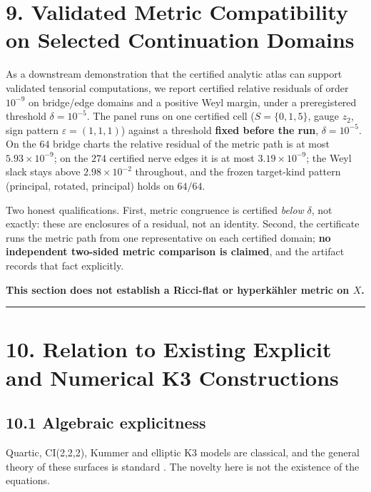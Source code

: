 \section{9. Validated Metric Compatibility on Selected Continuation Domains}\label{validated-metric-compatibility-on-selected-continuation-domains}

As a downstream demonstration that the certified analytic atlas can support validated tensorial computations, we report certified relative residuals of order \(10^{-9}\) on bridge/edge domains and a positive Weyl margin, under a preregistered threshold \(\delta = 10^{-5}\). The panel runs on one certified cell (\(S = \{0,1,5\}\), gauge \(z_2\), sign pattern \(\varepsilon = (1,1,1)\)) against a threshold \textbf{fixed before the run}, \(\delta = 10^{-5}\). On the \(64\) bridge charts the relative residual of the metric path is at most \(5.93 \times 10^{-9}\); on the \(274\) certified nerve edges it is at most \(3.19 \times 10^{-9}\); the Weyl slack stays above \(2.98 \times 10^{-2}\) throughout, and the frozen target-kind pattern (principal, rotated, principal) holds on \(64/64\).

Two honest qualifications. First, metric congruence is certified \emph{below} \(\delta\), not exactly: these are enclosures of a residual, not an identity. Second, the certificate runs the metric path from one representative on each certified domain; \textbf{no independent two-sided metric comparison is claimed}, and the artifact records that fact explicitly.

\textbf{This section does not establish a Ricci-flat or hyperkähler metric on \(X\).}

\begin{center}\rule{\linewidth}{0.5pt}\end{center}

\section{10. Relation to Existing Explicit and Numerical K3 Constructions}\label{relation-to-existing-explicit-and-numerical-k3-constructions}

\subsection{10.1 Algebraic explicitness}\label{algebraic-explicitness}

Quartic, CI(2,2,2), Kummer and elliptic K3 models are classical, and the general theory of these surfaces is standard \cite{1,2}. The novelty here is not the existence of the equations.

